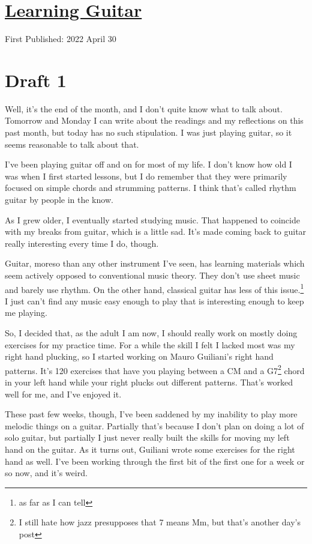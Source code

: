 \documentclass[12pt]{article}[titlepage]
\newcommand{\1}{\={a}}
\newcommand{\2}{\={e}}
\newcommand{\3}{\={\i}}
\newcommand{\4}{\=o}
\newcommand{\5}{\=u}
\newcommand{\6}{\={A}}
\renewcommand{\,}{\textsuperscript{,}}
\begin{document}
\doublespacing
\section{\href{learning-guitar.html}{Learning Guitar}}
First Published: 2022 April 30


\section{Draft 1}
Well, it's the end of the month, and I don't quite know what to talk about.
Tomorrow and Monday I can write about the readings and my reflections on this past month, but today has no such stipulation.
I was just playing guitar, so it seems reasonable to talk about that.

I've been playing guitar off and on for most of my life.
I don't know how old I was when I first started lessons, but I do remember that they were primarily focused on simple chords and strumming patterns.
I think that's called rhythm guitar by people in the know.

As I grew older, I eventually started studying music.
That happened to coincide with my breaks from guitar, which is a little sad.
It's made coming back to guitar really interesting every time I do, though.

Guitar, moreso than any other instrument I've seen, has learning materials which seem actively opposed to conventional music theory.
They don't use sheet music and barely use rhythm.
On the other hand, classical guitar has less of this issue.\footnote{as far as I can tell}
I just can't find any music easy enough to play that is interesting enough to keep me playing.

So, I decided that, as the adult I am now, I should really work on mostly doing exercises for my practice time.
For a while the skill I felt I lacked most was my right hand plucking, so I started working on Mauro Guiliani's right hand patterns.
It's 120 exercises that have you playing between a CM and a G7\footnote{I still hate how jazz presupposes that 7 means Mm, but that's another day's post} chord in your left hand while your right plucks out different patterns.
That's worked well for me, and I've enjoyed it.

These past few weeks, though, I've been saddened by my inability to play more melodic things on a guitar.
Partially that's because I don't plan on doing a lot of solo guitar, but partially I just never really built the skills for moving my left hand on the guitar.
As it turns out, Guiliani wrote some exercises for the right hand as well.
I've been working through the first bit of the first one for a week or so now, and it's weird.
\end{document}
